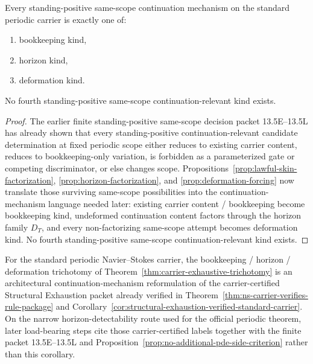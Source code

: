 \begin{manualtheorem}
\label{thm:carrier-exhaustive-trichotomy}
Every standing-positive same-scope continuation mechanism on the standard periodic carrier is exactly one of:
\begin{enumerate}[label=(\roman*), leftmargin=2.2em]
\item bookkeeping kind,
\item horizon kind,
\item deformation kind.
\end{enumerate}
No fourth standing-positive same-scope continuation-relevant kind exists.
\end{manualtheorem}

\begin{proof}
The earlier finite standing-positive same-scope decision packet 13.5E--13.5L has already shown that every
standing-positive continuation-relevant candidate determination at fixed periodic scope either reduces to existing carrier content,
reduces to bookkeeping-only variation, is forbidden as a parameterized gate or competing
discriminator, or else changes scope. Propositions~\ref{prop:lawful-skin-factorization},
\ref{prop:horizon-factorization}, and \ref{prop:deformation-forcing} now translate those surviving
same-scope possibilities into the continuation-mechanism language needed later: existing carrier
content / bookkeeping become bookkeeping kind, undeformed continuation content factors through the
horizon family $D_T$, and every non-factorizing same-scope attempt becomes deformation kind. No fourth
standing-positive same-scope continuation-relevant kind exists.
\end{proof}

\begin{manualcorollary}
\label{cor:derived-structural-exhaustion}
For the standard periodic Navier--Stokes carrier, the bookkeeping / horizon / deformation trichotomy of
Theorem~\ref{thm:carrier-exhaustive-trichotomy} is an architectural continuation-mechanism reformulation
of the carrier-certified Structural Exhaustion packet already verified in
Theorem~\ref{thm:ns-carrier-verifies-rule-package} and
Corollary~\ref{cor:structural-exhaustion-verified-standard-carrier}. On the narrow
horizon-detectability route used for the official periodic theorem, later load-bearing steps cite those
carrier-certified labels together with the finite packet 13.5E--13.5L and
Proposition~\ref{prop:no-additional-pde-side-criterion} rather than this corollary.
\end{manualcorollary}

